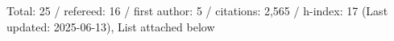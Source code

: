 Total: 25 / refereed: 16 / first author: 5 / citations: 2,565 / h-index: 17 (Last updated: 2025-06-13), List attached below